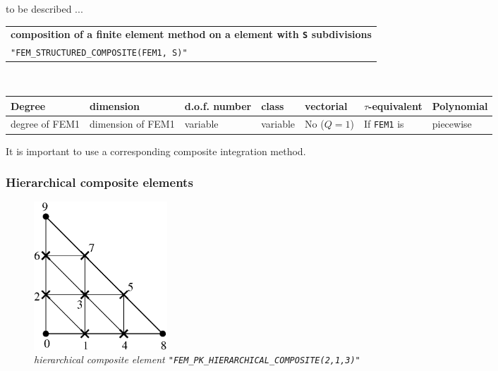 \documentclass[11pt,a4paper]{article}
\begin{document}
to be described ...

\begin{center}
\begin{tabular}{|m{16.109cm}|} \hline 
{\bf composition of a finite element method on a element with {\tt S} subdivisions}\\
{\tt "FEM\_STRUCTURED\_COMPOSITE(FEM1, S)"} 
\end{tabular} \\ \vspace{-1pt} 
\begin{tabular}{|m{2cm}|m{2cm}|m{2.5cm}|m{1.5cm}|m{1.5cm}|m{2cm}|m{2cm}|} \hline 
Degree & dimension & d.o.f. number & class & vectorial & \mbox{$\tau$-equivalent} & Polynomial\\ \hline
\small degree of FEM1 & \small dimension of FEM1 & variable & variable & No \mbox{($Q = 1$)} & If {\tt FEM1} is  & piecewise\\ \hline
\end{tabular}
\end{center}

It is important to use a corresponding composite integration method.

\subsubsection{Hierarchical composite elements}

\begin{figure}[H]
  \begin{center}
    \includegraphics[width=5cm,angle=0]{getfemlist_triangle_P1comp_hier.eps}
  \end{center}
  \caption{ \it hierarchical composite element {\tt "FEM\_PK\_HIERARCHICAL\_COMPOSITE(2,1,3)"}} 
  \label{fig:triangle_comp}
\end{figure}
\end{document}
